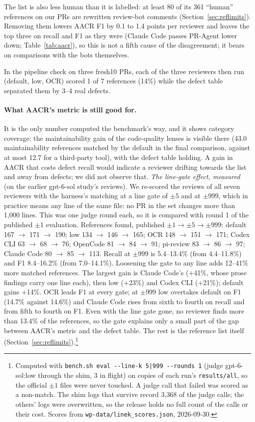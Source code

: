 \documentclass[11pt,a4paper]{article}
\newcommand{\code}[1]{\texttt{#1}}
\begin{document}
The list is also less human than it is labelled: at least 80 of its 361
``human'' references on our PRs are rewritten review-bot comments
(Section~\ref{sec:reflimits}). Removing them lowers AACR F1 by 0.1 to 1.4
points per reviewer and leaves the top three on recall and F1 as they were
(Claude Code passes PR-Agent lower down; Table~\ref{tab:aacr}), so this is not a fifth cause of the
disagreement; it bears on comparisons with the bots themselves.

In the pipeline check on three fresh10 PRs, each of the three reviewers
then run (default, low, OCR) scored 1 of 7 references (14\%) while the
defect table separated them by 3--4 real defects.

\paragraph{What AACR's metric is still good for.} It is the only number
computed the benchmark's way, and it shows category coverage: the
maintainability gain of the code-quality lenses is visible there (43.0
maintainability references matched by the default in the final
comparison, against at most 12.7 for a third-party tool), with the defect
table holding. A gain in AACR that
costs defect recall would indicate a reviewer drifting towards the list
and away from defects; we did not observe that.
\emph{The line-gate effect, measured} (on the earlier gpt-6-sol study's
reviews). We re-scored the reviews of all seven reviewers with the harness's matching at a line gate
of $\pm5$ and at $\pm999$, which in practice means any line of the same
file: no PR in the set changes more than 1{,}000 lines. This was one judge
round each, so it is compared with round 1 of the published $\pm1$
evaluation. References found, published $\pm1 \to \pm5 \to \pm999$:
default 167 $\to$ 171 $\to$ 190; low 134 $\to$ 146 $\to$ 165; OCR 148
$\to$ 151 $\to$ 171; Codex CLI 63 $\to$ 68 $\to$ 76; OpenCode 81
$\to$ 84 $\to$ 91; pi-review 83 $\to$ 86 $\to$ 97; Claude Code 80
$\to$ 85 $\to$ 113. Recall at $\pm999$ is 5.4--13.4\% (from 4.4--11.8\%)
and F1 8.4--16.2\% (from 7.0--14.1\%). Loosening the gate to any line adds 12--41\%
more matched references. The largest gain is Claude Code's (+41\%, whose
prose findings carry one line each), then low (+23\%) and Codex CLI
(+21\%); default gains +14\%. OCR leads F1 at every gate; at $\pm999$ low
overtakes default on F1 (14.7\% against 14.6\%) and Claude Code rises from
sixth to fourth on recall and from fifth to fourth on F1. Even with the line gate gone, no reviewer finds
more than 13.4\% of the references, so the gate explains only a small
part of the gap between AACR's metric and the defect table. The rest is
the reference list itself (Section~\ref{sec:reflimits}).\footnote{Computed
with \code{bench.sh eval -{}-line-k 5|999 -{}-rounds 1} (judge gpt-6-sol:low
through the shim, 3 in flight) on copies of each run's \code{results/all},
so the official $\pm1$ files were never touched. A judge call that failed
was scored as a non-match. The shim logs that survive record 3{,}368 of the
judge calls; the others' logs were overwritten, so the release holds no full
count of the calls or their cost. Scores from
\code{wp-data/linek\_scores.json}, 2026-09-30.}
\end{document}
